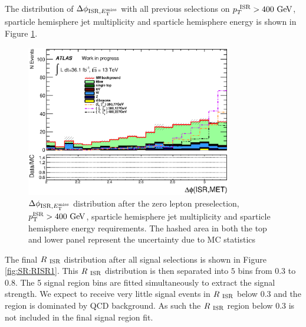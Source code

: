 \indent The distribution of $\dPhiISRMET$ with all previous selections on $\PTISR > 400 \gev$, sparticle hemisphere jet multiplicity and sparticle hemisphere energy is shown in Figure \ref{fig:SR:dphiISRMET}. \\  %

\begin{figure}[h!]
  \begin{center}
     \includegraphics[width=0.80\textwidth]{figures/plotSR/SR_ND1_dphiISRI_6SR.eps}
  \caption[$\dPhiISRMET$ distribution after the zero lepton preselection, $\pTISR > 400 \gev$, sparticle hemisphere jet multiplicity and sparticle hemisphere energy requirements]{$\dPhiISRMET$ distribution after the zero lepton preselection, $\pTISR > 400 \gev$, sparticle hemisphere jet multiplicity and sparticle hemisphere energy requirements. The hashed area in both the top and lower panel represent the uncertainty due to MC statistics}
  \label{fig:SR:dphiISRMET}
    \end{center}
\end{figure}

\indent The final $R_{~\mathrm{ISR}}$ distribution after all signal selections is shown in Figure \ref{fig:SR:RISR1}.  This $R_{~\mathrm{ISR}}$ distribution is then separated into $5$ bins from $0.3$ to $0.8$.  The 5 signal region bins are fitted simultaneously to extract the signal strength.  We expect to receive very little signal events in $R_{~\mathrm{ISR}}$ below 0.3 and the region is dominated by QCD background.  As such the $R_{~\mathrm{ISR}}$ region below 0.3 is not included in the final signal region fit.  \\

